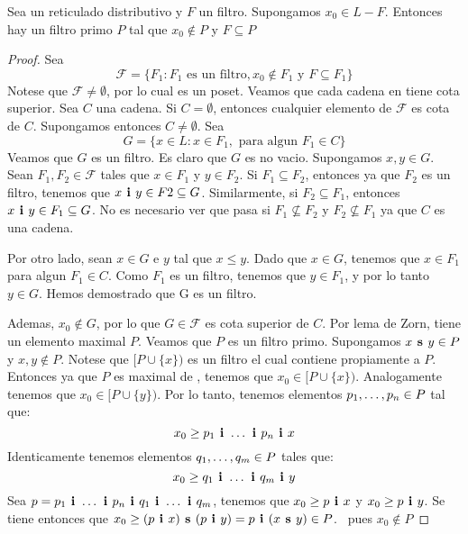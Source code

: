 \begin{theorem}
  Sea \reticulAlg un reticulado distributivo y $F$ un filtro. Supongamos $x_0 \in L - F$. Entonces hay un filtro primo
  $P$ tal que $x_0 \notin P$ y $F \subseteq P$
\end{theorem}
\begin{proof}
  Sea 
  $$
  \mathcal{F} = \{F_1 : F_1 \text{ es un filtro}, x_0 \not\in F_1 \text{ y } F \subseteq F_1\}
  $$
  Notese que $\mathcal{F} \neq \emptyset$, por lo cual  es un poset. Veamos que cada cadena en 
   tiene cota superior. Sea $C$ una cadena. Si $C = \emptyset$, entonces cualquier elemento de $\mathcal{F}$
  es cota de $C$. Supongamos entonces $C \neq \emptyset$. Sea 
  $$
  G = \{x \in L : x \in F_1, \text{ para algun } F_1 \in C\}
  $$
  Veamos que $G$ es un filtro. Es claro que $G$ es no vacio. Supongamos $x, y \in G$. Sean $F_1, F_2 \in \mathcal{F}$ tales que
  $x \in F_1$ y $y \in F_2$. Si $F_1 \subseteq F_2$, entonces ya que $F_2$ es un filtro, tenemos que $\infbin{x}{y} \in F2 \subseteq G$.
  Similarmente, si $F_2 \subseteq F_1$, entonces $\infbin{x}{y} \in F_1 \subseteq G$. No es necesario ver que pasa si
  $F_1 \not\subseteq F_2$ y $F_2 \not\subseteq F_1$ ya que $C$ es una cadena.

  Por otro lado, sean $x \in G$ e $y$ tal que $x \leq y$. Dado que $x \in G$, tenemos que $x \in F_1$ para algun $F_1 \in C$. Como $F_1$
  es un filtro, tenemos que $y \in F_1$, y por lo tanto $y \in G$. Hemos demostrado que G es un filtro.

  Ademas, $x_0 \not\in G$, por lo que $G \in \mathcal{F}$ es cota superior de $C$. Por lema de Zorn, 
  tiene un elemento maximal $P$. Veamos que $P$ es un filtro primo. Supongamos $\supbin{x}{y} \in P$ y $x, y \not\in P$. Notese que $[P \cup \{x\})$ es un filtro el
  cual contiene propiamente a $P$. Entonces ya que $P$ es maximal de , tenemos que $x_0 \in [P \cup \{x\})$.
  Analogamente tenemos que $x_0 \in [P \cup \{y\})$. Por lo tanto, tenemos elementos $\succession{p}{1}{n} \in P$ tal que:
  $$
  x_0 \geq \succession[\textbf{ i }]{p}{1}{n} \textbf{ i } x
  $$
  Identicamente tenemos elementos $\succession{q}{1}{m} \in P$ tales que:
  $$
  x_0 \geq \succession[\textbf{ i }]{q}{1}{m} \textbf{ i } y
  $$
  Sea $p = \succession[\textbf{ i }]{p}{1}{n} \textbf{ i }\succession[\textbf{ i }]{q}{1}{m}$, tenemos que
  $x_0 \geq \infbin{p}{x}$ y $x_0 \geq \infbin{p}{y}$.
  Se tiene entonces que $x_0 \geq \supbin{(\infbin{p}{x})}{(\infbin{p}{y})} = \infbin{p}{(\supbin{x}{y})} \in P$. \abs\ pues $x_0\not\in P$
\end{proof}

